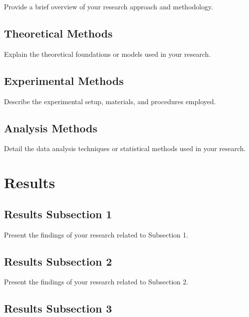 \documentclass[12pt]{article}
\begin{document}
Provide a brief overview of your research approach and methodology.

\subsection{Theoretical Methods}
\label{subsec:theoretical}

Explain the theoretical foundations or models used in your research.

\subsection{Experimental Methods}


\label{subsec:experimental}

Describe the experimental setup, materials, and procedures employed.

\subsection{Analysis Methods}
\label{subsec:analysis}

Detail the data analysis techniques or statistical methods used in your research.

\section{Results}
\label{sec:results}

\subsection{Results Subsection 1}
\label{subsec:results1}

Present the findings of your research related to Subsection 1.

\subsection{Results Subsection 2}
\label{subsec:results2}

Present the findings of your research related to Subsection 2.

\subsection{Results Subsection 3}
\label{subsec:results3}
\end{document}

